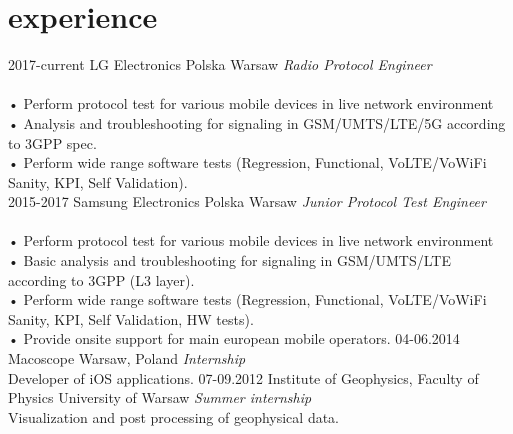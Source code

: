 \documentclass[]{friggeri-cv} %
\begin{document}
\section{experience}

\begin{entrylist}
\entry
	{2017-current}
	{LG Electronics Polska}
	{Warsaw}
	{
		\emph{Radio Protocol Engineer} \\\\
		\footnotesize{
			• Perform protocol test for various mobile devices in live network environment\\
			• Analysis and troubleshooting for signaling in GSM/UMTS/LTE/5G according to 3GPP spec.\\
			• Perform wide range software tests (Regression, Functional, VoLTE/VoWiFi Sanity, KPI, Self Validation).\\
		}
	}
\entry
	{2015-2017}
	{Samsung Electronics Polska}
	{Warsaw}
	{
		\emph{Junior Protocol Test Engineer} \\\\
		\footnotesize{
			• Perform protocol test for various mobile devices in live network environment\\
			• Basic analysis and troubleshooting for signaling in GSM/UMTS/LTE according to 3GPP (L3 layer).\\
			• Perform wide range software tests (Regression, Functional, VoLTE/VoWiFi Sanity, KPI, Self Validation, HW tests).\\
			• Provide onsite support for main european mobile operators.
		}
	}
\entry
	{04-06.2014}
	{Macoscope}
	{Warsaw, Poland}
	{
		\emph{Internship} \\
		Developer of iOS applications.
	}
\entry
	{07-09.2012}
	{Institute of Geophysics, {\normalfont Faculty of Physics}}
	{University of Warsaw}
	{
		\emph{Summer internship} \\
		Visualization and post processing of geophysical data.	
	}
\end{entrylist}

%
\end{document}
